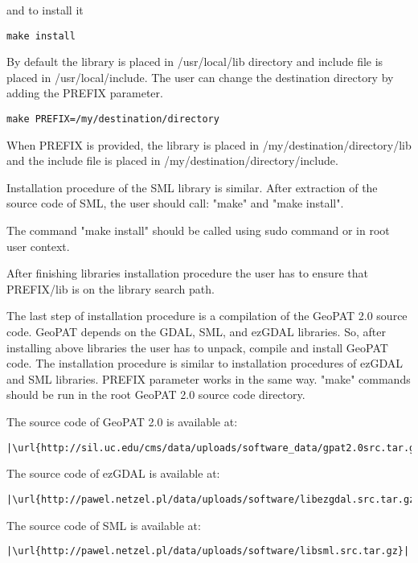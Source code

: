and to install it

\begin{lstlisting}
make install
\end{lstlisting}

By default the library is placed in /usr/local/lib directory and
include file is placed in /usr/local/include.
The user can change the destination directory by adding the PREFIX parameter.

\begin{lstlisting}
make PREFIX=/my/destination/directory
\end{lstlisting}

When PREFIX is provided, the library is placed in
/my/destination/directory/lib and the include file is placed in
/my/destination/directory/include.

Installation procedure of the SML library is similar. After extraction of the source code of SML, the user should call: "make" and "make install".

The command "make install" should be called using sudo command or in
root user context.

After finishing libraries installation procedure the user has to ensure that
PREFIX/lib is on the library search path.

The last step of installation procedure is a compilation of the GeoPAT 2.0
source code. GeoPAT depends on the GDAL, SML, and ezGDAL libraries.
So, after installing above libraries the user has to unpack, compile
and install GeoPAT code.
The installation procedure is similar to installation procedures of
ezGDAL and SML libraries. PREFIX parameter works in the same way.
"make" commands should be run in the root GeoPAT 2.0 source code
directory.

The source code of GeoPAT 2.0 is available at:

\begin{lstlisting}[escapechar=|]
|\url{http://sil.uc.edu/cms/data/uploads/software_data/gpat2.0src.tar.gz}|
\end{lstlisting}

The source code of ezGDAL is available at:

\begin{lstlisting}[escapechar=|]
|\url{http://pawel.netzel.pl/data/uploads/software/libezgdal.src.tar.gz}|
\end{lstlisting}

The source code of SML is available at:

\begin{lstlisting}[escapechar=|]
|\url{http://pawel.netzel.pl/data/uploads/software/libsml.src.tar.gz}|
\end{lstlisting}